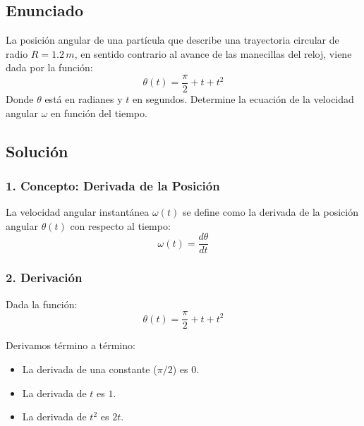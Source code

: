 \documentclass[12pt, a4paper]{article}
\begin{document}
\newpage

\subsection*{Enunciado}
La posición angular de una partícula que describe una trayectoria circular de radio $R = 1.2 \, \si{m}$, en sentido contrario al avance de las manecillas del reloj, viene dada por la función:
$$ \theta(t) = \frac{\pi}{2} + t + t^2 $$
Donde $\theta$ está en radianes y $t$ en segundos. Determine la ecuación de la velocidad angular $\omega$ en función del tiempo.

\begin{center}
\end{center}

\subsection*{Solución}

\subsubsection*{1. Concepto: Derivada de la Posición}
La velocidad angular instantánea $\omega(t)$ se define como la derivada de la posición angular $\theta(t)$ con respecto al tiempo:
$$ \omega(t) = \frac{d\theta}{dt} $$

\subsubsection*{2. Derivación}
Dada la función:
$$ \theta(t) = \frac{\pi}{2} + t + t^2 $$

Derivamos término a término:
\begin{itemize}
    \item La derivada de una constante ($\pi/2$) es $0$.
    \item La derivada de $t$ es $1$.
    \item La derivada de $t^2$ es $2t$.
\end{itemize}
\end{document}

